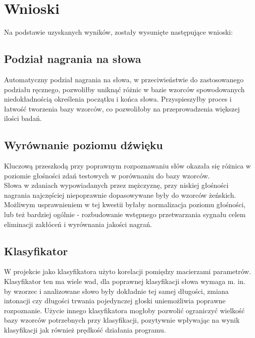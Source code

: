 \section{Wnioski}

Na podstawie uzyskanych wyników, zostały wysunięte następujące wnioski:

\subsection{Podział nagrania na słowa}
Automatyczny podział nagrania na słowa, w przeciwieństwie do zastosowanego podziału ręcznego, pozwoliłby uniknąć różnic w bazie wzorców spowodowanych niedokładnością określenia początku i końca słowa. Przyspieszyłby proces i łatwość tworzenia bazy wzorców, co pozwoliłoby na przeprowadzenia większej ilości badań.

\subsection{Wyrównanie poziomu dźwięku}
Kluczową przeszkodą przy poprawnym rozpoznawaniu słów okazała się różnica w poziomie głośności zdań testowych w porównaniu do bazy wzorców. \\
Słowa w zdaniach wypowiadanych przez mężczyznę, przy niskiej głośności nagrania najczęściej niepoprawnie dopasowywane były do wzorców żeńskich. \\
Możliwym usprawnieniem w tej kwestii byłaby normalizacja poziomu głośności, lub też bardziej ogólnie - rozbudowanie wstępnego przetwarzania sygnału celem eliminacji zakłóceń i wyrównania jakości nagrań.


\subsection{Klasyfikator}
W projekcie jako klasyfikatora użyto korelacji pomiędzy macierzami parametrów. Klasyfikator ten ma wiele wad, dla poprawnej klasyfikacji słowa wymaga m. in. by wzorzec i analizowane słowo były dokładnie tej samej długości, zmiana intonacji czy długości trwania pojedynczej głoski uniemożliwia poprawne rozpoznanie. Użycie innego klasyfikatora mogłoby pozwolić ograniczyć wielkość bazy wzorców potrzebnych przy klasyfikacji, pozytywnie wpływając na wynik klasyfikacji jak również prędkość działania programu.

